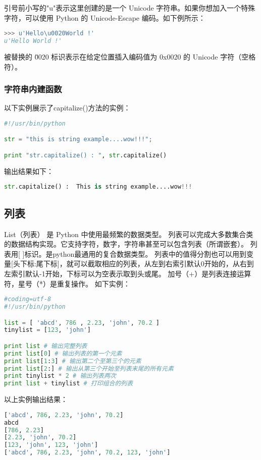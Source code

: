 引号前小写的"u"表示这里创建的是一个 Unicode 字符串。如果你想加入一个特殊字符，可以使用 Python 的 Unicode-Escape 编码。如下例所示：
\begin{lstlisting}[language=Python]
>>> u'Hello\u0020World !'
u'Hello World !'
\end{lstlisting}
被替换的 \u0020 标识表示在给定位置插入编码值为 0x0020 的 Unicode 字符（空格符）。


\subsubsection{字符串内建函数}
 以下实例展示了capitalize()方法的实例：
\begin{lstlisting}[language=Python]
#!/usr/bin/python

str = "this is string example....wow!!!";

print "str.capitalize() : ", str.capitalize()
\end{lstlisting}
输出结果如下：
\begin{lstlisting}[language=Python]
str.capitalize() :  This is string example....wow!!!
\end{lstlisting}


\subsection{列表}
List（列表） 是 Python 中使用最频繁的数据类型。
列表可以完成大多数集合类的数据结构实现。它支持字符，数字，字符串甚至可以包含列表（所谓嵌套）。
列表用[ ]标识。是python最通用的复合数据类型。
列表中的值得分割也可以用到变量[头下标:尾下标]，就可以截取相应的列表，从左到右索引默认0开始的，从右到左索引默认-1开始，下标可以为空表示取到头或尾。
加号（+）是列表连接运算符，星号（*）是重复操作。
如下实例：
\begin{lstlisting}[language=Python]
#coding=utf-8
#!/usr/bin/python

list = [ 'abcd', 786 , 2.23, 'john', 70.2 ]
tinylist = [123, 'john']

print list # 输出完整列表
print list[0] # 输出列表的第一个元素
print list[1:3] # 输出第二个至第三个的元素 
print list[2:] # 输出从第三个开始至列表末尾的所有元素
print tinylist * 2 # 输出列表两次
print list + tinylist # 打印组合的列表
\end{lstlisting}
以上实例输出结果：
\begin{lstlisting}[language=Python]
['abcd', 786, 2.23, 'john', 70.2]
abcd
[786, 2.23]
[2.23, 'john', 70.2]
[123, 'john', 123, 'john']
['abcd', 786, 2.23, 'john', 70.2, 123, 'john']
\end{lstlisting}


